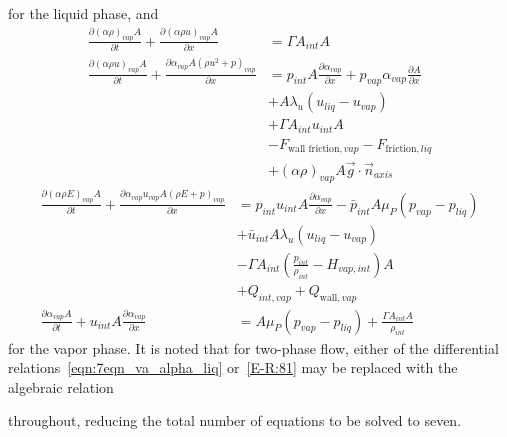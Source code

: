 for the liquid phase, and
\begin{align}
  \frac{\partial \left( \alpha \rho \right)_{vap} A}{\partial t}
  + \frac{\partial \left( \alpha \rho u \right)_{vap} A}{\partial x}
  &=  \Gamma A_{int} A
  \\
  \nonumber
  \frac{\partial \left( \alpha \rho u \right)_{vap} A}{\partial t}
  + \frac{\partial \alpha_{vap} A \left( \rho u^2 + p \right)_{vap} }{\partial x}
  &= p_{int} A \frac{\partial \alpha_{vap}}{\partial x} + p_{vap} \alpha_{vap} \frac{\partial A}{\partial x}
  \\
  \nonumber
  &+ A \lambda_u (u_{liq} - u_{vap})
  \\
  \nonumber
  &+ \Gamma A_{int} u_{int} A
  \\
  \nonumber
  &- F_{\text{wall friction}, vap} - F_{\text{friction}, liq}
  \\
  &+ \left( \alpha \rho \right)_{vap} A \vec{g} \cdot \vec{n}_{axis}
\end{align}
\begin{align}
  \nonumber
  \frac{\partial \left( \alpha \rho E \right)_{vap} A}{\partial t}
  + \frac{\partial \alpha_{vap} u_{vap} A \left( \rho E + p \right)_{vap}}{\partial x}
  &= p_{int} u_{int} A \frac{\partial \alpha_{vap}}{\partial x} - \bar{p}_{int} A \mu_P (p_{vap} - p_{liq})
  \\
  \nonumber
  &+ \bar{u}_{int} A \lambda_u (u_{liq} - u_{vap})
  \\
  \nonumber
  &- \Gamma A_{int} \left( \frac{p_{int}}{\rho_{int}} - H_{vap, int} \right) A
  \\
  &+ Q_{int, vap} + Q_{\text{wall}, vap}
  \\
  \label{E-R:81}
  \frac{\partial \alpha_{vap} A}{\partial t} + u_{int} A \frac{\partial \alpha_{vap}}{\partial x}
  &= A \mu_P (p_{vap} - p_{liq}) + \frac{\Gamma A_{int} A}{\rho_{int}}
\end{align}
for the vapor phase.  It is noted that for two-phase flow,
either of the differential relations~\eqref{eqn:7eqn_va_alpha_liq}
or~\eqref{E-R:81} may be replaced with the algebraic relation

throughout, reducing the total number of equations to be solved to seven.


